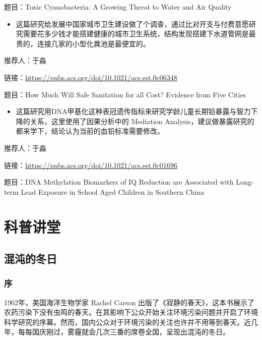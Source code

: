 \documentclass[
]{book}
\providecommand{\tightlist}{%
  \setlength{\itemsep}{0pt}\setlength{\parskip}{0pt}}
\begin{document}
题目：Toxic Cyanobacteria: A Growing Threat to Water and Air Quality

\begin{itemize}
\tightlist
\item
  这篇研究给发展中国家城市卫生建设做了个调查，通过比对开支与付费意愿研究需要花多少钱才能搭建健康的城市卫生系统，结构发现搭建下水道管网是最贵的，连接几家的小型化粪池是最便宜的。
\end{itemize}

推荐人：于淼

链接：\url{https://pubs.acs.org/doi/10.1021/acs.est.0c06348}

题目：How Much Will Safe Sanitation for all Cost? Evidence from Five Cities

\begin{itemize}
\tightlist
\item
  这篇研究用DNA甲基化这种表冠遗传指标来研究学龄儿童长期铅暴露与智力下降的关系，这里使用了因果分析中的 Mediation Analysis，建议做暴露研究的都来学下，结论认为当前的血铅标准需要修改。
\end{itemize}

推荐人：于淼

链接：\url{https://pubs.acs.org/doi/10.1021/acs.est.0c01696}

题目：DNA Methylation Biomarkers of IQ Reduction are Associated with Long-term Lead Exposure in School Aged Children in Southern China

\hypertarget{popsci}{%
\chapter{科普讲堂}\label{popsci}}

\hypertarget{ux6df7ux6c8cux7684ux51acux65e5}{%
\section{混沌的冬日}\label{ux6df7ux6c8cux7684ux51acux65e5}}

\hypertarget{ux5e8f}{%
\subsection{序}\label{ux5e8f}}

1962年，美国海洋生物学家 Rachel Carson 出版了《寂静的春天》，这本书展示了农药污染下没有虫鸣的春天。在其影响下公众开始关注环境污染问题并开启了环境科学研究的序幕。然而，国内公众对于环境污染的关注也许并不用等到春天。近几年，每每国庆刚过，雾霾就会几次三番的席卷全国，呈现出混沌的冬日。
\end{document}
